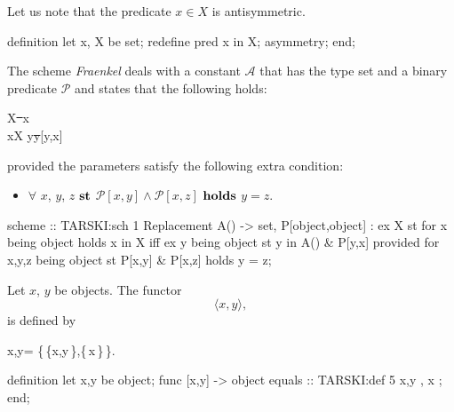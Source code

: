 \begin{paracol}{2}
\switchcolumn*
\noindent%
Let us note that the predicate $x\in X$ is antisymmetric.

\switchcolumn

\begin{mizar}
definition let x, X be set;
  redefine pred x in X;
  asymmetry;
end;
\end{mizar}

\switchcolumn*\ensurevspace{5cm}

The scheme \textit{Fraenkel} deals with a constant $\mathcal{A}$ that
has the type set and a binary predicate $\mathcal{P}$ and states that
the following holds:
\begin{scheme+}
  \ex X\st\ \forall x\holds \\
  x\in X\iff
\ex y\st y\in{}\land{}[y,x]
\end{scheme+}
provided the parameters satisfy the following extra condition:
\begin{itemize}
\item $\forall$ $x$, $y$, $z$ $\mathrel{\textbf{st}}$ 
  $\mathcal{P}[x,y]\land\mathcal{P}[x,z]$ $\mathrel{\textbf{holds}}$  $y=z$.
\end{itemize}

\switchcolumn

\begin{mizar}
scheme :: TARSKI:sch 1
 Replacement{ A() -> set,
              P[object,object] }:
 ex X
 st for x being object 
    holds x in X iff
          ex y being object 
          st y in A() & P[y,x]
provided
 for x,y,z being object 
 st P[x,y] & P[x,z]
 holds y = z;
\end{mizar}

\switchcolumn*\ensurevspace{5cm}
Let $x$, $y$ be objects. The functor
\[\langle x,y\rangle,\]
is defined by
\begin{definition}
\langle x,y\rangle = \{\,\{x,y\,\},\{\,x\,\}\,\}.
\end{definition}

\switchcolumn
\begin{mizar}
definition
  let x,y be object;
  func [x,y] -> object equals
:: TARSKI:def 5
    { { x,y }, { x } };
end;
\end{mizar}


\switchcolumn*\ensurevspace{5cm}


\end{paracol}

